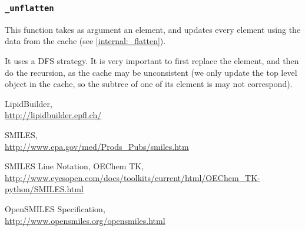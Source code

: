 \documentclass[a4paper, 11pt]{article}
\begin{document}
\subsubsection{\tt \_unflatten}\label{internal:_unflatten}

This function takes as argument an element, and updates every element using the data from the cache (see \ref{internal:_flatten}).

It uses a DFS strategy. It is very important to first replace the element, and then do the recursion, as the cache may be unconsistent (we only update the top level object in the cache, so the subtree of one of its element is may not correspond).


 
\begin{thebibliography}{9}

    LipidBuilder,\\
    \url{http://lipidbuilder.epfl.ch/}
      
    SMILES,\\
    \url{http://www.epa.gov/med/Prods_Pubs/smiles.htm}
    
    SMILES Line Notation, OEChem TK,\\
    \url{http://www.eyesopen.com/docs/toolkits/current/html/OEChem_TK-python/SMILES.html}
    
    OpenSMILES Specification,\\
    \url{http://www.opensmiles.org/opensmiles.html}
    
\end{thebibliography}
\end{document}
